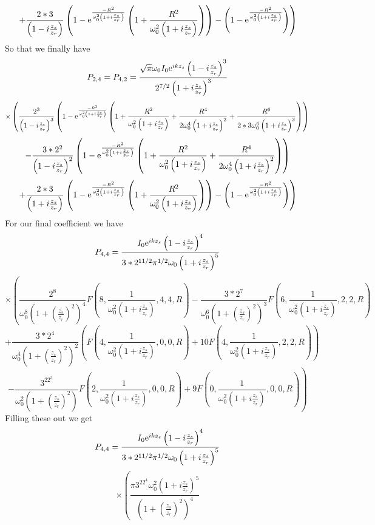 \documentclass[11pt]{amsart}
\makeatletter
\newcommand{\e}{{\rm e}}				%
\newcommand{\0}{\varnothing}		%
\newcommand{\1}{!}
\newcommand{\2}{@}
\newcommand{\3}{\#}
\newcommand{\4}{\$}
\newcommand{\5}{\%}
\newcommand{\6}{$^\wedge$}
\newcommand{\7}{\&}
\newcommand{\8}{*}
\newcommand{\9}{(}
\makeatother
\begin{document}
\[
\left. +\frac{2*3}{\left(1-i\frac{z_s}{z_r}\right)}\left(1-\e^{\frac{-R^2}{\omega_0^2\left(1+i\frac{z_s}{z_r}\right)}}\left(1+\frac{R^2}{\omega_0^2\left(1+i\frac{z_s}{z_r}\right)}\right)\right) -  \left(1-\e^{\frac{-R^2}{\omega_0^2\left(1+i\frac{z_s}{z_r}\right)}}\right)\right)
\]
So that we finally have
\[
P_{2,4} = P_{4,2} = \frac{\sqrt{\pi}\omega_0I_0\e^{ikz_s}\left(1-i\frac{z_s}{z_r}\right)^3}{2^{7/2}\left(1+i\frac{z_s}{z_r}\right)^3}
\]
\[
\times\left(\frac{2^3}{\left(1-i\frac{z_s}{z_r}\right)^3}\left(1-\e^{\frac{-R^2}{\omega_0^2\left(1+i\frac{z_s}{z_r}\right)}}\left(1+\frac{R^2}{\omega_0^2\left(1+i\frac{z_s}{z_r}\right)}+\frac{R^4}{2\omega_0^4\left(1+i\frac{z_s}{z_r}\right)^2} + \frac{R^6}{2*3\omega_0^6\left(1+i\frac{z_s}{z_r}\right)^3}\right)\right)\right.
\]
\[
\left. - \frac{3*2^2}{\left(1-i\frac{z_s}{z_r}\right)^2}\left(1-\e^{\frac{-R^2}{\omega_0^2\left(1+i\frac{z_s}{z_r}\right)}}\left(1+\frac{R^2}{\omega_0^2\left(1+i\frac{z_s}{z_r}\right)}+\frac{R^4}{2\omega_0^4\left(1+i\frac{z_s}{z_r}\right)^2} \right)\right)\right.
\]
\[
\left. +\frac{2*3}{\left(1+i\frac{z_s}{z_r}\right)}\left(1-\e^{\frac{-R^2}{\omega_0^2\left(1+i\frac{z_s}{z_r}\right)}}\left(1+\frac{R^2}{\omega_0^2\left(1+i\frac{z_s}{z_r}\right)}\right)\right) -  \left(1-\e^{\frac{-R^2}{\omega_0^2\left(1+i\frac{z_s}{z_r}\right)}}\right)\right)
\]
For our final coefficient we have
\[
P_{4,4} = \frac{I_0\e^{ikz_s}\left(1-i\frac{z_s}{z_r}\right)^4}{3*2^{11/2}\pi^{1/2}\omega_0\left(1+i\frac{z_s}{z_r}\right)^5}
\]
\[
\times\left(\frac{2^8}{\omega_0^8\left(1+\left(\frac{z_s}{z_r}\right)^2\right)^4}F\left(8,\frac{1}{\omega_0^2\left(1+i\frac{z_s}{z_r}\right)},4,4,R\right)-\frac{3*2^7}{\omega_0^6\left(1+\left(\frac{z_s}{z_r}\right)^2\right)^3}F\left(6,\frac{1}{\omega_0^2\left(1+i\frac{z_s}{z_r}\right)},2,2,R\right)\right.
\]
\[
\left. +\frac{3*2^4}{\omega_0^4\left(1+\left(\frac{z_s}{z_r}\right)^2\right)^2}\left(F\left(4,\frac{1}{\omega_0^2\left(1+i\frac{z_s}{z_r}\right)},0,0,R\right) + 10F\left(4,\frac{1}{\omega_0^2\left(1+i\frac{z_s}{z_r}\right)},2,2,R\right)\right)\right.
\]
\[
\left.-\frac{3^22^3}{\omega_0^2\left(1+\left(\frac{z_s}{z_r}\right)^2\right)}F\left(2,\frac{1}{\omega_0^2\left(1+i\frac{z_s}{z_r}\right)},0,0,R\right)+ 9F\left(0,\frac{1}{\omega_0^2\left(1+i\frac{z_s}{z_r}\right)},0,0,R\right)\right)
\]
Filling these out we get
\[
P_{4,4} = \frac{I_0\e^{ikz_s}\left(1-i\frac{z_s}{z_r}\right)^4}{3*2^{11/2}\pi^{1/2}\omega_0\left(1+i\frac{z_s}{z_r}\right)^5}
\]
\[
\times\left(\frac{\pi3^22^4\omega_0^2\left(1+i\frac{z_s}{z_r}\right)^5}{\left(1+\left(\frac{z_s}{z_r}\right)^2\right)^4}\right.
\]
\end{document}
